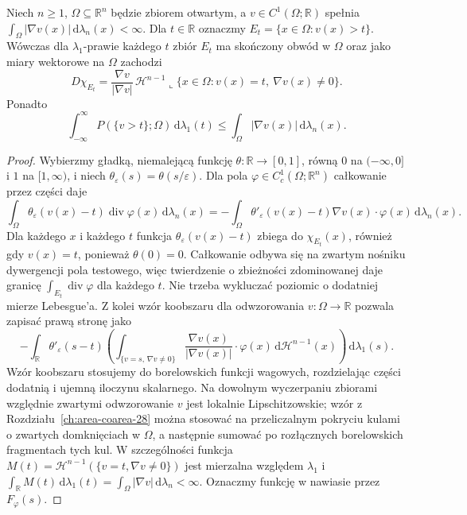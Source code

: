 \begin{lemat}
\label{lem:BV-smooth-levels}
Niech $n\ge1$, $\Omega\subseteq\mathbb R^n$ będzie
zbiorem otwartym, a $v\in C^1(\Omega;\mathbb R)$
spełnia $\int_\Omega|\nabla v(x)|\,\mathrm d\lambda_n(x)<\infty$.
Dla $t\in\mathbb R$ oznaczmy $E_t=\{x\in\Omega:v(x)>t\}$.
Wówczas dla $\lambda_1$-prawie każdego $t$
zbiór $E_t$ ma skończony obwód w $\Omega$ oraz
jako miary wektorowe na $\Omega$ zachodzi
\[
 D\chi_{E_t}=
 \frac{\nabla v}{|\nabla v|}\,
 \mathcal H^{n-1}\llcorner
 \{x\in\Omega:v(x)=t,\ \nabla v(x)\ne0\}.
\]
Ponadto
\[
 \int_{-\infty}^{\infty}P(\{v>t\};\Omega)
 \,\mathrm d\lambda_1(t)
 \le\int_\Omega|\nabla v(x)|\,\mathrm d\lambda_n(x).
\]
\end{lemat}
\begin{proof}
Wybierzmy gładką, niemalejącą funkcję
$\theta:\mathbb R\to[0,1]$, równą $0$ na
$(-\infty,0]$ i $1$ na $[1,\infty)$, i niech
$\theta_\varepsilon(s)=\theta(s/\varepsilon)$.
Dla pola $\varphi\in C_c^1(\Omega;\mathbb R^n)$
całkowanie przez części daje
\[
 \int_\Omega\theta_\varepsilon(v(x)-t)
 \operatorname{div}\varphi(x)\,\mathrm d\lambda_n(x)
 =-\int_\Omega\theta'_\varepsilon(v(x)-t)
 \nabla v(x)\cdot\varphi(x)\,\mathrm d\lambda_n(x).
\]
Dla każdego $x$ i każdego $t$ funkcja
$\theta_\varepsilon(v(x)-t)$ zbiega do
$\chi_{E_t}(x)$, również gdy $v(x)=t$,
ponieważ $\theta(0)=0$. Całkowanie odbywa się
na zwartym nośniku dywergencji pola testowego,
więc twierdzenie o zbieżności zdominowanej
daje granicę $\int_{E_t}\operatorname{div}\varphi$
dla każdego $t$. Nie trzeba wykluczać poziomic
o dodatniej mierze Lebesgue'a.
Z kolei wzór koobszaru dla odwzorowania
$v:\Omega\to\mathbb R$ pozwala zapisać
prawą stronę jako
\[
 -\int_{\mathbb R}\theta'_\varepsilon(s-t)
 \left(\int_{\{v=s,\,\nabla v\ne0\}}
 \frac{\nabla v(x)}{|\nabla v(x)|}\cdot\varphi(x)
 \,\mathrm d\mathcal H^{n-1}(x)\right)
 \,\mathrm d\lambda_1(s).
\]
Wzór koobszaru stosujemy do borelowskich
funkcji wagowych, rozdzielając części dodatnią
i ujemną iloczynu skalarnego. Na dowolnym
wyczerpaniu zbiorami względnie zwartymi
odwzorowanie $v$ jest lokalnie Lipschitzowskie;
wzór z Rozdziału~\ref{ch:area-coarea-28}
można stosować na przeliczalnym pokryciu
kulami o zwartych domknięciach w $\Omega$,
a następnie sumować po rozłącznych borelowskich
fragmentach tych kul. W szczególności funkcja
$M(t)=\mathcal H^{n-1}(\{v=t,\nabla v\ne0\})$
jest mierzalna względem $\lambda_1$ i
$\int_{\mathbb R}M(t)\,\mathrm d\lambda_1(t)
=\int_\Omega|\nabla v|\,\mathrm d\lambda_n<\infty$.
Oznaczmy funkcję w nawiasie przez $F_\varphi(s)$.

\end{proof}
